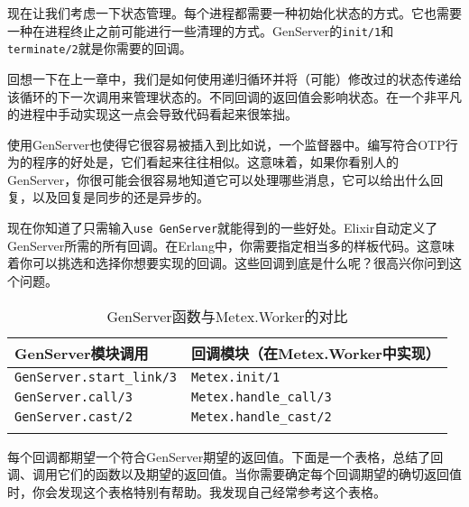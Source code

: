 现在让我们考虑一下状态管理。每个进程都需要一种初始化状态的方式。它也需要一种在进程终止之前可能进行一些清理的方式。GenServer的\texttt{init/1}和\texttt{terminate/2}就是你需要的回调。

回想一下在上一章中，我们是如何使用递归循环并将（可能）修改过的状态传递给该循环的下一次调用来管理状态的。不同回调的返回值会影响状态。在一个非平凡的进程中手动实现这一点会导致代码看起来很笨拙。

使用GenServer也使得它很容易被插入到比如说，一个监督器中。编写符合OTP行为的程序的好处是，它们看起来往往相似。这意味着，如果你看别人的GenServer，你很可能会很容易地知道它可以处理哪些消息，它可以给出什么回复，以及回复是同步的还是异步的。

现在你知道了只需输入\texttt{use GenServer}就能得到的一些好处。Elixir自动定义了GenServer所需的所有回调。在Erlang中，你需要指定相当多的样板代码。这意味着你可以挑选和选择你想要实现的回调。这些回调到底是什么呢？很高兴你问到这个问题。

\begin{longtable}[]{@{}ll@{}}
\toprule()
GenServer模块调用 & 回调模块（在Metex.Worker中实现） \\
\midrule()
\endhead
\texttt{GenServer.start\_link/3} &
\texttt{Metex.init/1} \\
\texttt{GenServer.call/3} &
\texttt{Metex.handle\_call/3} \\
\texttt{GenServer.cast/2} &
\texttt{Metex.handle\_cast/2} \\
\bottomrule()
\caption{GenServer函数与Metex.Worker的对比}
\label{table:genserver_metex}
\end{longtable}

每个回调都期望一个符合GenServer期望的返回值。下面是一个表格，总结了回调、调用它们的函数以及期望的返回值。当你需要确定每个回调期望的确切返回值时，你会发现这个表格特别有帮助。我发现自己经常参考这个表格。


